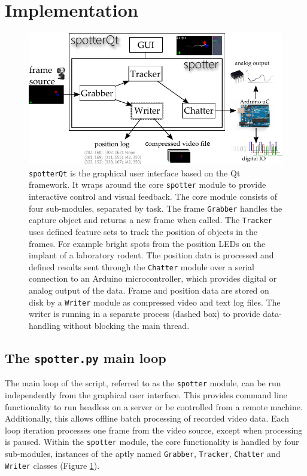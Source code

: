 \section{Implementation}
\begin{figure}%
	\centering
		\includegraphics [width=\linewidth]{gfx/SpotterImplement_noInput.pdf} %
	\caption[Test]{\texttt{spotterQt} is the graphical user interface based on the Qt framework. It wraps around the core \texttt{spotter} module to provide interactive control and visual feedback. The core module consists of four sub-modules, separated by task. The frame \texttt{Grabber} handles the capture object and returns a new frame when called. The \texttt{Tracker} uses defined feature sets to track the position of objects in the frames. For example bright spots from the position LEDs on the implant of a laboratory rodent. The position data is processed and defined results sent through the \texttt{Chatter} module over a serial connection to an Arduino microcontroller, which provides digital or analog output of the data. Frame and position data are stored on disk by a \texttt{Writer} module as compressed video and text log files. The writer is running in a separate process (dashed box) to provide data-handling without blocking the main thread.}

	\label{fig:implement}
\end{figure}

\subsection{The \texttt{spotter.py} main loop}
The main loop of the script, referred to as the \texttt{spotter} module, can be run independently from the graphical user interface. This provides command line functionality to run headless on a server or be controlled from a remote machine. Additionally, this allows offline batch processing of recorded video data. Each loop iteration processes one frame from the video source, except when processing is paused. Within the \texttt{spotter} module, the core functionality is handled by four sub-modules, instances of the aptly named \texttt{Grabber}, \texttt{Tracker}, \texttt{Chatter} and \texttt{Writer} classes (Figure \ref{fig:implement}).


